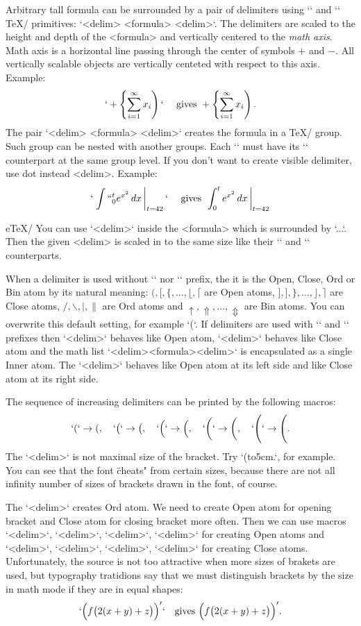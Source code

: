 Arbitrary tall formula can be surrounded by a pair of delimiters using
`\left` and `\right` \TeX/ primitives: `\left<delim> <formula> \right<delim>`.
The delimiters are scaled to the height and depth of the <formula>
and vertically centered to the {\em math axis}.\fnote
{Math axis is a horizontal line passing through the center of symbols $+$
 and $-$. All vertically scalable objects are vertically centeted with
 respect to this axis.} 
Example:
$$
  `+ \left\{ \sum_{i=1}^\infty x_i \right)` \quad \hbox{ gives }  
   + \left\{ \sum_{i=1}^\infty x_i \right).
$$
The pair `\left<delim> <formula> \right<delim>` creates the formula in a
\TeX/ group. Such group can be nested with another groups. 
Each `\left` must have its `\right` counterpart at the same group level.
If you don't want to create visible delimiter, use dot instead <delim>.
Example:
$$
  `\left. \int``_0^t e^{x^2}\,dx\, \right|_{t=42}` \quad \hbox{ gives }
   \left. \int_0^t e^{x^2} \,dx\, \right|_{t=42}
$$
 
\new e\TeX/
You can use `\middle<delim>` inside the <formula> which is surrounded by
`\left...\right`. Then the given <delim> is scaled in to the same size like
their `\left` and `\right` counterparts. 

When a delimiter is used without `\left` nor `\right` prefix, the it is the
Open, Close, Ord or Bin atom by its natural meaning:
$(, [, \{, \ldots, \lfloor, \lceil$ are Open atoms,
$], ], \}, \ldots, \rfloor, \rceil$ are Close atoms, 
$/, \backslash, |, \|$ are Ord atoms and 
$\uparrow, \Uparrow, \ldots, \Updownarrow$ are Bin atoms. You can overwrite
this default setting, for example `\mathclose(`. If delimiters are used with
`\left` and `\right` prefixes then `\left<delim>` behaves like Open atom,
`\right<delim>` behaves like Close atom and the math list
`\left<delim><formula>\right<delim>` is encapsulated as a single Inner atom.
The `\middle<delim>` behaves like Open atom at its left side and like Close
atom at its right side. 

The sequence of increasing delimiters can be printed by the following
macros:
$$
  `(` \to (,\quad `\big(` \to \big(,\quad `\Big(` \to \Big(,\quad
  `\bigg(` \to \bigg(, \quad `\Bigg(` \to \Bigg(.
$$
The `\Bigg<delim>` is not maximal size of the bracket. Try 
`\left(\vbox to5cm{}\right.`, for example. You can see that the font 
\"cheats" from certain sizes, because there are not all infinity number of
sizes of brackets drawn in the font, of course.

The `\big<delim>` creates Ord atom. We need to create Open atom
for opening bracket and Close atom for closing bracket more often. 
Then we can use macros
`\bigl<delim>`, 
`\Bigl<delim>`, 
`\biggl<delim>`, 
`\Biggl<delim>` for creating Open atoms and
`\bigr<delim>`, 
`\Bigr<delim>`, 
`\biggr<delim>`, 
`\Biggr<delim>` for creating Close atoms. Unfortunately, the source is not
too attractive when more sizes of brakets are used, but typography
tratidions say that we must distinguish brackets by the size in math
mode if they are in equal shapes:
$$
  `\Bigl( f\bigl( 2(x+y) + z\bigr) \Bigr)'` \quad \hbox{gives }
  \Bigl(f\bigl(2(x+y)+z\bigr)\Bigr)'. 
$$


